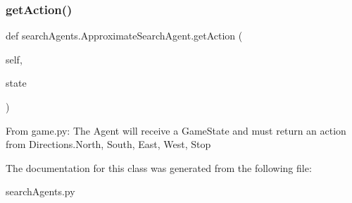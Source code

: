 \subsubsection{\texorpdfstring{get\+Action()}{getAction()}}
{\footnotesize\ttfamily def search\+Agents.\+Approximate\+Search\+Agent.\+get\+Action (\begin{DoxyParamCaption}\item[{}]{self,  }\item[{}]{state }\end{DoxyParamCaption})}

\begin{DoxyVerb}From game.py:
The Agent will receive a GameState and must return an action from
Directions.{North, South, East, West, Stop}
\end{DoxyVerb}
 

The documentation for this class was generated from the following file\+:\begin{DoxyCompactItemize}
\item 
search\+Agents.\+py\end{DoxyCompactItemize}
